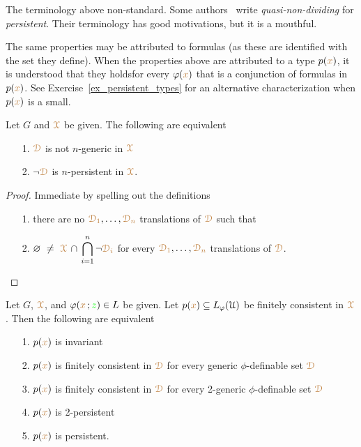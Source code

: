 \noindent\llap{\textcolor{red}{\Large\warning}\kern1.5ex}\ignorespaces
The terminology above non-standard.
Some authors~\cite{CK} write \textit{quasi-non-dividing\/} for \textit{persistent}.
Their terminology has good motivations, but it is a mouthful.

The same properties may be attributed to formulas (as these are identified with the set they define).
When the properties above are attributed to a type $p({\color{brown} x})$, it is understood that they holdsfor every $\varphi({\color{brown} x})$ that is a conjunction of formulas in $p({\color{brown} x})$.
See Exercise~\ref{ex_persistent_types} for an alternative characterization when $p({\color{brown} x})$ is a small.

\begin{fact}\label{fact_fip}
  Let $G$ and ${\color{brown}\EuScript X}$ be given.
  The following are equivalent
  \begin{itemize}
    \item[1.] ${\color{brown}\EuScript D}$ is not $n$-generic in ${\color{brown}\EuScript X}$
    \item[2.] $\neg{\color{brown}\EuScript D}$ is $n$-persistent in ${\color{brown}\EuScript X}$.
  \end{itemize}
\end{fact}

\begin{proof}
  Immediate by spelling out the definitions\smallskip
  \begin{itemize}
    \item[1.] there are no ${\color{brown}\EuScript D_1},\dots,{\color{brown}\EuScript D_n}$ translations of ${\color{brown}\EuScript D}$ such that 
    \item[2.]  $\displaystyle\0\ \neq\ \mrX\,\cap\,\bigcap_{i=1}^n\neg{\mr\D_i}$ for every ${\color{brown}\EuScript D_1},\dots,{\color{brown}\EuScript D_n}$ translations of ${\color{brown}\EuScript D}$.\qedhere
  \end{itemize} 
\end{proof}

\begin{theorem}\label{thm_generic_invariant}
  Let $G$,  ${\color{brown}\EuScript X}$, and $\varphi({\color{brown} x}\,;{\color{green} z})\in L$ be given.
  Let $p({\color{brown} x})\subseteq L_\varphi(\EuScript U)$ be finitely consistent in ${\color{brown}\EuScript X}$.
  Then the following are equivalent
  \begin{itemize}
    \item[1.] $p({\color{brown} x})$ is invariant
    \item[2.] $p({\color{brown} x})$ is finitely consistent in ${\color{brown}\EuScript D}$ for every generic $\phi$-definable set ${\color{brown}\EuScript D}$
    \item[3.] $p({\color{brown} x})$ is finitely consistent in ${\color{brown}\EuScript D}$ for every 2-generic $\phi$-definable set ${\color{brown}\EuScript D}$
    \item[4.] $p({\color{brown} x})$ is 2-persistent
    \item[5.] $p({\color{brown} x})$ is persistent.
  \end{itemize}
\end{theorem}

